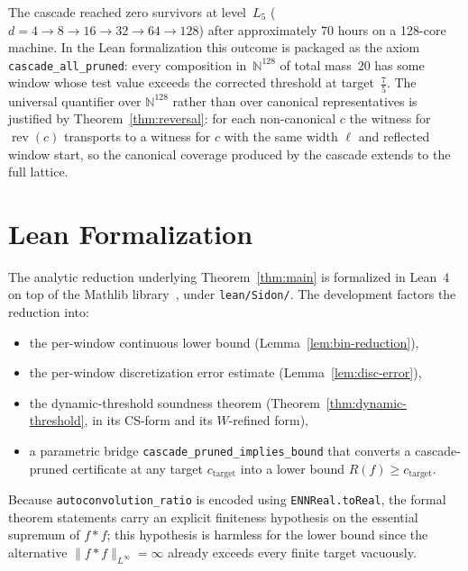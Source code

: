 \documentclass[11pt, letterpaper]{article}
\theoremstyle{paperplain}
\theoremstyle{paperdef}
\newcommand{\N}{\mathbb{N}}
\newcommand{\rev}{\operatorname{rev}}
\begin{document}
The cascade reached zero survivors at level~$L_5$
($d=4 \to 8 \to 16 \to 32 \to 64 \to 128$) after approximately
$70$ hours on a 128-core machine.  In the Lean formalization this
outcome is packaged as the axiom \texttt{cascade\_all\_pruned}: every
composition in~$\N^{128}$ of total mass~$20$ has some window whose test
value exceeds the corrected threshold at target~$\tfrac75$.  The
universal quantifier over $\N^{128}$ rather than over canonical
representatives is justified by Theorem~\ref{thm:reversal}: for each
non-canonical $c$ the witness for $\rev(c)$ transports to a witness
for $c$ with the same width $\ell$ and reflected window start, so the
canonical coverage produced by the cascade extends to the full lattice.

\section{Lean Formalization}\label{sec:formalization}

The analytic reduction underlying Theorem~\ref{thm:main} is formalized
in Lean~4~\cite{Lean4} on top of the Mathlib library~\cite{Mathlib},
under \texttt{lean/Sidon/}.  The development factors the reduction
into:
\begin{itemize}
  \item the per-window continuous lower bound
    (Lemma~\ref{lem:bin-reduction}),
  \item the per-window discretization error estimate
    (Lemma~\ref{lem:disc-error}),
  \item the dynamic-threshold soundness theorem
    (Theorem~\ref{thm:dynamic-threshold}, in its CS-form and its
    $W$-refined form),
  \item a parametric bridge \texttt{cascade\_pruned\_implies\_bound}
    that converts a cascade-pruned certificate at any target
    $c_{\mathrm{target}}$ into a lower bound $R(f)\ge c_{\mathrm{target}}$.
\end{itemize}

Because \texttt{autoconvolution\_ratio} is encoded using
\texttt{ENNReal.toReal}, the formal theorem statements carry an
explicit finiteness hypothesis on the essential supremum of $f*f$;
this hypothesis is harmless for the lower bound since the alternative
$\|f*f\|_{L^\infty}=\infty$ already exceeds every finite target
vacuously.
\end{document}
